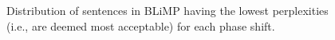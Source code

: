 \begin{figure}
    \centering
    \caption{Distribution of sentences in BLiMP \cite{warstadt-etal-2020-BLiMP-benchmark} having the lowest perplexities (i.e., are deemed most acceptable) for each phase shift.}
    \label{fig:ppl_density_main}
\end{figure}